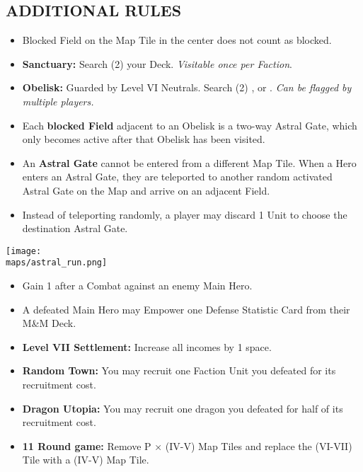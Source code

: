 \begin{multicols}{2}
\subsection*{\MakeUppercase{Additional Rules}}
\begin{itemize}
  \item Blocked Field on the Map Tile in the center does not count as blocked.
  \item \textbf{Sanctuary:} Search (2) your Deck. \textit{Visitable once per Faction}.
  \item \textbf{Obelisk:} Guarded by Level VI Neutrals. Search (2) ,  or . \textit{Can be flagged by multiple players.}
  \item Each \textbf{blocked Field} adjacent to an Obelisk is a two-way Astral Gate, which only becomes active after that Obelisk has been visited.
  \item An \textbf{Astral Gate} cannot be entered from a different Map Tile. When a Hero enters an Astral Gate, they are teleported to another random activated Astral Gate on the Map and arrive on an adjacent Field.
  \item Instead of teleporting randomly, a player may discard 1 Unit to choose the destination Astral Gate.
\end{itemize}
  
  \begin{center}
  \vspace*{\fill}
  \vspace*{\fill}
  \texttt{[image: \\maps/astral\_run.png]}
  \vspace*{\fill}
  \end{center}

\begin{itemize}
  \item Gain 1  after a Combat against an enemy Main Hero.
  \item A defeated Main Hero may Empower one Defense Statistic Card from their M\&M Deck.
  \item \textbf{Level VII Settlement:} Increase all incomes by 1 space.
  \item \textbf{Random Town:} You may recruit one Faction Unit you defeated for its recruitment cost.
  \item \textbf{Dragon Utopia:} You may recruit one dragon you defeated for half of its recruitment cost.
  \item \textbf{11 Round game:} Remove P × (IV-V) Map Tiles and replace the (VI-VII) Tile with a (IV-V) Map Tile.
\end{itemize}


\end{multicols}

